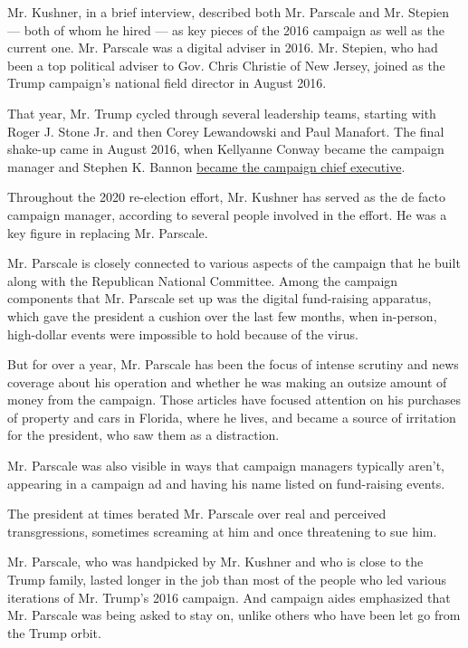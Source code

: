 Mr. Kushner, in a brief interview, described both Mr. Parscale and Mr.
Stepien --- both of whom he hired --- as key pieces of the 2016 campaign
as well as the current one. Mr. Parscale was a digital adviser in 2016.
Mr. Stepien, who had been a top political adviser to Gov. Chris Christie
of New Jersey, joined as the Trump campaign's national field director in
August 2016.

That year, Mr. Trump cycled through several leadership teams, starting
with Roger J. Stone Jr. and then Corey Lewandowski and Paul Manafort.
The final shake-up came in August 2016, when Kellyanne Conway became the
campaign manager and Stephen K. Bannon
\href{https://www.nytimes3xbfgragh.onion/2016/08/18/us/politics/donald-trump-stephen-bannon-paul-manafort.html}{became
the campaign chief executive}.

Throughout the 2020 re-election effort, Mr. Kushner has served as the de
facto campaign manager, according to several people involved in the
effort. He was a key figure in replacing Mr. Parscale.

Mr. Parscale is closely connected to various aspects of the campaign
that he built along with the Republican National Committee. Among the
campaign components that Mr. Parscale set up was the digital
fund-raising apparatus, which gave the president a cushion over the last
few months, when in-person, high-dollar events were impossible to hold
because of the virus.

But for over a year, Mr. Parscale has been the focus of intense scrutiny
and news coverage about his operation and whether he was making an
outsize amount of money from the campaign. Those articles have focused
attention on his purchases of property and cars in Florida, where he
lives, and became a source of irritation for the president, who saw them
as a distraction.

Mr. Parscale was also visible in ways that campaign managers typically
aren't, appearing in a campaign ad and having his name listed on
fund-raising events.

The president at times berated Mr. Parscale over real and perceived
transgressions, sometimes screaming at him and once threatening to sue
him.

Mr. Parscale, who was handpicked by Mr. Kushner and who is close to the
Trump family, lasted longer in the job than most of the people who led
various iterations of Mr. Trump's 2016 campaign. And campaign aides
emphasized that Mr. Parscale was being asked to stay on, unlike others
who have been let go from the Trump orbit.

